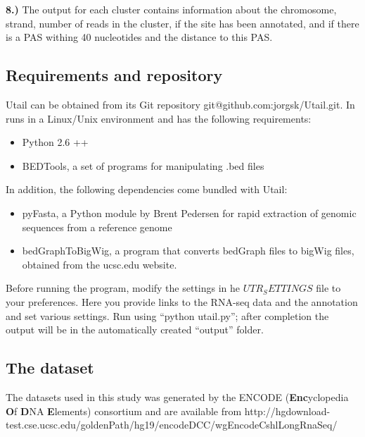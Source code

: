 \textbf{8.)} The output for each cluster contains information about the
chromosome, strand, number of reads in the cluster, if the site has been
annotated, and if there is a PAS withing 40 nucleotides and the distance to
this PAS.

\subsection{Requirements and repository}
Utail can be obtained from its Git repository git@github.com:jorgsk/Utail.git.
In runs in a Linux/Unix environment and has the following requirements:
\begin{itemize}
	\item Python 2.6 ++
	\item BEDTools, a set of programs for manipulating .bed files
		\cite{quinlan_bedtools:_2010}
\end{itemize}
In addition, the following dependencies come bundled with Utail:
\begin{itemize}
	\item pyFasta, a Python module by Brent Pedersen for rapid extraction of
		genomic sequences from a reference genome
	\item bedGraphToBigWig, a program that converts bedGraph files to bigWig
		files, obtained from the ucsc.edu website.
\end{itemize}
Before running the program, modify the settings in he $UTR_SETTINGS$ file to your
preferences. Here you provide links to the RNA-seq data and the annotation and
set various settings. Run using ``python utail.py''; after completion the
output will be in the automatically created ``output'' folder.

\subsection{The dataset}
The datasets used in this study was generated by the ENCODE
(\textbf{Enc}yclopedia \textbf{O}f \textbf{D}NA \textbf{E}lements) consortium
and are available from http://hgdownload-test.cse.ucsc.edu/goldenPath/hg19/encodeDCC/wgEncodeCshlLongRnaSeq/

